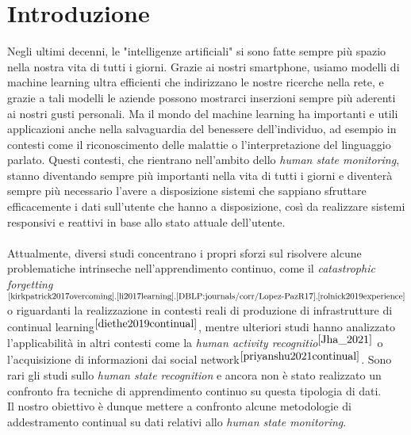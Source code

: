 \chapter*{Introduzione}

Negli ultimi decenni, le "intelligenze artificiali" si sono fatte sempre più spazio nella nostra vita di tutti i giorni. Grazie ai nostri smartphone, usiamo modelli di machine learning ultra efficienti che indirizzano le nostre ricerche nella rete, e grazie a tali modelli le aziende possono mostrarci inserzioni sempre più aderenti ai nostri gusti personali. Ma il mondo del machine learning ha importanti e utili applicazioni anche nella salvaguardia del benessere dell'individuo, ad esempio in contesti come il riconoscimento delle malattie o l'interpretazione del linguaggio parlato. Questi contesti, che rientrano nell'ambito dello \textit{human state monitoring}, stanno diventando sempre più importanti nella vita di tutti i giorni e diventerà sempre più necessario l'avere a disposizione sistemi che sappiano sfruttare efficacemente i dati sull'utente che hanno a disposizione, così da realizzare sistemi responsivi e reattivi in base allo stato attuale dell'utente.\\\\
Attualmente, diversi studi concentrano i propri sforzi sul risolvere alcune problematiche intrinseche nell'apprendimento continuo, come il \textit{catastrophic forgetting}$^{\cite{kirkpatrick2017overcoming},\cite{li2017learning},\cite{DBLP:journals/corr/Lopez-PazR17},\cite{rolnick2019experience}}$ o riguardanti la realizzazione in contesti reali di produzione di infrastrutture di continual learning$^{\cite{diethe2019continual}}$, mentre ulteriori studi hanno analizzato l'applicabilità in altri contesti come la \textit{human activity recognitio}$^{\cite{Jha_2021}}$ o l'acquisizione di informazioni dai social network$^{\cite{priyanshu2021continual}}$. Sono rari gli studi sullo \textit{human state recognition} e ancora non è stato realizzato un confronto fra tecniche di apprendimento continuo su questa tipologia di dati.\\
Il nostro obiettivo è dunque mettere a confronto alcune metodologie di addestramento continual su dati relativi allo \textit{human state monitoring}.
\pagebreak
